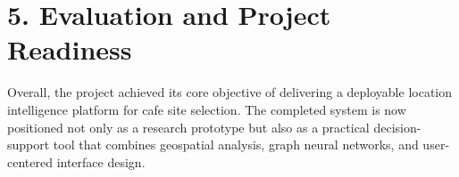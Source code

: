 \section*{5. Evaluation and Project Readiness}
Overall, the project achieved its core objective of delivering a deployable location intelligence platform for cafe site selection. The completed system is now positioned not only as a research prototype but also as a practical decision-support tool that combines geospatial analysis, graph neural networks, and user-centered interface design.